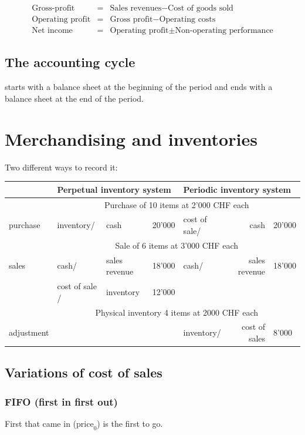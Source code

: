 \documentclass[a4paper] {scrartcl}
\begin{document}
\begin{eqnarray}
	\text{Gross-profit} &=& \text{Sales revenues}- \text{Cost of goods sold}\\
	\text{Operating profit} &=& \text{Gross profit}- \text{Operating costs}\\
	\text{Net income} &=& \text{Operating profit} \pm \text{Non-operating performance}
\end{eqnarray}

\subsection{The accounting cycle}
starts with a balance sheet at the beginning of the period and ends with a balance sheet at the end of the period.


\section{Merchandising and inventories}
Two different ways to record it:

\begin{tabular}{lllllrl}
	&\multicolumn{3}{l}{\textbf{Perpetual inventory system}} 
	& \multicolumn{3}{l}{\textbf{Periodic inventory system}}\\
	\hline
	&\multicolumn{6}{c}{Purchase of 10 items at 2'000 CHF each} \\
	purchase 
		& inventory/& cash& 20'000 
		&cost of sale/& cash& 20'000	\\
		&\multicolumn{6}{c}{Sale of 6 items at 3'000 CHF each} \\
	sales 
		& cash/& sales revenue & 18'000
		& cash/& sales revenue& 18'000\\
	& cost of sale /& inventory & 12'000\\
	&\multicolumn{6}{c}{Physical inventory 4 items at 2000 CHF each}\\
	adjustment &&& & inventory/& cost of sales& 8'000\\
	\hline
\end{tabular}

\subsection{Variations of cost of sales}
\subsubsection{FIFO (first in first out)}
First that came in ($\text{price}_0$) is the first to go.
\end{document}
